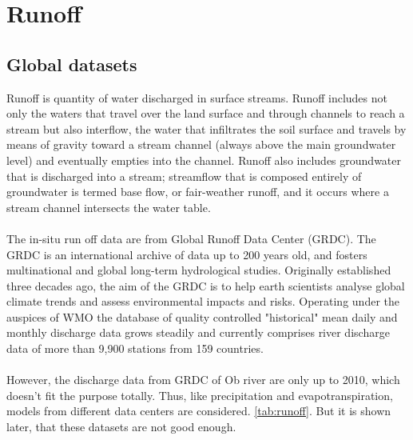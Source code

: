 \section{Runoff}\label{sec:runoff}
\subsection{Global datasets}
Runoff is quantity of water discharged in surface streams. Runoff includes not only the waters that travel over the land surface and through channels to reach a stream but also interflow, the water that infiltrates the soil surface and travels by means of gravity toward a stream channel (always above the main groundwater level) and eventually empties into the channel. Runoff also includes groundwater that is discharged into a stream; streamflow that is composed entirely of groundwater is termed base flow, or fair-weather runoff, and it occurs where a stream channel intersects the water table.\\\\
The in-situ run off data are from Global Runoff Data Center (GRDC). The GRDC is an international archive of data up to 200 years old, and fosters multinational and global long-term hydrological studies. Originally established three decades ago, the aim of the GRDC is to help earth scientists analyse global climate trends and assess environmental impacts and risks. Operating under the auspices of WMO the database of quality controlled "historical" mean daily and monthly discharge data grows steadily and currently comprises river discharge data of more than 9,900 stations from 159 countries.\\\\
However, the discharge data from GRDC of Ob river are only up to 2010, which doesn't fit the purpose totally. Thus, like precipitation and evapotranspiration, models from different data centers are considered. \autoref{tab:runoff}. But it is shown later, that these datasets are not good enough. 
